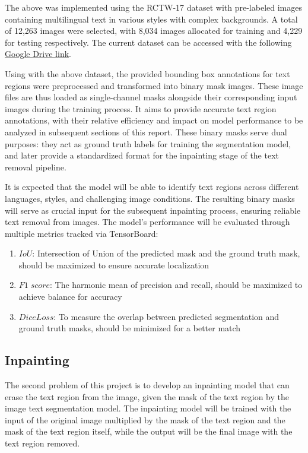 \documentclass[10pt,twocolumn,letterpaper]{article}
\begin{document}
The above was implemented using the RCTW-17 dataset with pre-labeled images containing multilingual text in various styles with complex backgrounds.
A total of 12,263 images were selected, with 8,034 images allocated for training and 4,229 for testing respectively. The current dataset can be accessed with the following 
\href{https://drive.google.com/drive/folders/1BbLe23KN1At6xsItvBcj9dXhPv6LdQH_?usp=sharing}{Google Drive link}.

Using with the above dataset, the provided bounding box annotations for text regions were preprocessed and transformed into binary mask images.
These image files are thus loaded as single-channel masks alongside their corresponding input images during the training process. 
It aims to provide accurate text region annotations, with their relative efficiency and impact on model performance to be analyzed in subsequent sections of this report. 
These binary masks serve dual purposes: they act as ground truth labels for training the segmentation model, and later provide a standardized format for the inpainting stage of the text removal pipeline.

It is expected that the model will be able to identify text regions across different languages, styles, and challenging image conditions. 
The resulting binary masks will serve as crucial input for the subsequent inpainting process, ensuring reliable text removal from images. 
The model's performance will be evaluated through multiple metrics tracked via TensorBoard:
\begin{enumerate}
    \item $IoU$: Intersection of Union of the predicted mask and the ground truth mask, should be maximized to ensure accurate localization
    \item $F1\;score$: The harmonic mean of precision and recall, should be maximized to achieve balance for accuracy 
    \item $Dice Loss$: To measure the overlap between predicted segmentation and ground truth masks, should be minimized for a better match
\end{enumerate}

\subsection{Inpainting}

The second problem of this project is to develop an inpainting model that can erase the text region from the image, given the mask of the text region by 
the image text segmentation model. The inpainting model will be trained with the input of the original image multiplied by the mask of the text region and 
the mask of the text region itself, while the output will be the final image with the text region removed.
\end{document}
